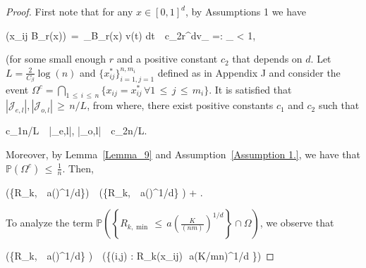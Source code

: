 \documentclass[twoside,11pt]{article}
\begin{document}
\begin{proof} First note that for any $x \in [0,1]^d$, by Assumptions 1 we have

\beq 
\label{eq:272}
\left(x_{ij} \in B_r(x)\right) \,=\, \int_{B_r(x)} v(t) dt \,\leq\, c_2r^dv_{\max} =: \mu_{\max} < 1,
\beq 

(for some small enough $r$ and a positive constant $c_2$ that depends on $d$. Let $L = \frac{2}{C_{\beta}} \log(n)$ and $\{x_{ij}^*\}_{i=1,j=1}^{n,m_i}$ defined as in Appendix J and consider the event $\Omega^c = \bigcap\limits_{1 \,\leq\, i \,\leq\, n}\{x_{ij} = x_{ij}^*\, \forall 1 \,\leq\, j \,\leq\, m_i\}$. It is satisfied that $|\mathcal{J}_{e,l}|, |\mathcal{J}_{o,l}| \,\geq\, n/L$, from where, there exist positive constants $c_1$ and $c_2$ such that

\beq 
\label{eq:273}
c_1n/L \,\leq\, |_{e,l}|, |_{o,l}| \,\leq\, c_2n/L.
\beq 

Moreover, by Lemma~\ref{Lemma_9} and Assumption~\ref{Assumption 1.}, we have that $\mathbb{P}(\Omega^c) \,\leq\, \frac{1}{n}$. Then,

\beq 
\label{eq:274}
\left(\left\{R_{k,\min} \,\leq\, a\left(\right)^{1/d}\right\}\right) \,\leq\, \left(\left\{R_{k,\min} \,\leq\, a\left(\right)^{1/d}\right\} \cap\Omega\right) + .
\beq 

To analyze the term $\mathbb{P}\left(\left\{R_{k,\min} \,\leq\, a\left(\frac{K}{(nm)}\right)^{1/d}\right\} \cap\Omega\right)$, we observe that

\beq 
\label{eq:275}
\left(\left\{R_{k,\min} \,\leq\, a\left(\right)^{1/d}\right\} \cap\Omega\right) \,\leq\, \left(\left\{\left(\exists i,j\right) \in [n] \times [m_i] : R_k(x_{ij})\,\leq\, a(K/mn)^{1/d} \right\}\cap \tilde \Omega\right)
\beq 


\end{proof}
\end{document}
